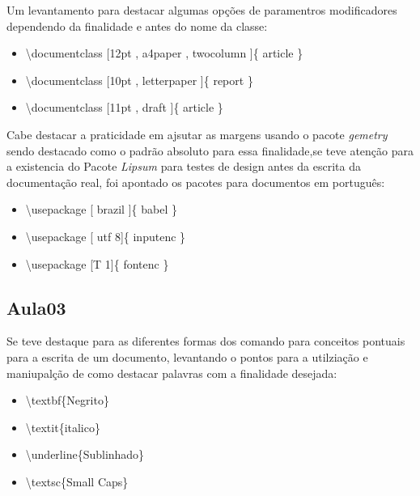 \documentclass[12pt, a4paper]{article}
\begin{document}
Um levantamento para destacar algumas opções de paramentros modificadores dependendo da finalidade e antes do nome da classe:
\begin{itemize}
    \item \textbackslash documentclass [12pt , a4paper , twocolumn ]\{ article \}
    \item \textbackslash documentclass [10pt , letterpaper ]\{ report \}
    \item  \textbackslash documentclass [11pt , draft ]\{ article \}

\end{itemize}

Cabe destacar a praticidade em ajsutar as margens usando o pacote \textit{gemetry} sendo destacado como o padrão absoluto para essa finalidade,se teve atenção para a existencia do Pacote \textit{Lipsum} para testes de design antes da escrita da documentação real,  foi apontado os pacotes para documentos em português:

\begin{itemize}
    \item \textbackslash usepackage [ brazil ]\{ babel \}
    \item \textbackslash usepackage [ utf 8]\{ inputenc \}
    \item  \textbackslash usepackage [T 1]\{ fontenc \}

\end{itemize}















\subsection{Aula03}
Se teve destaque para as diferentes formas dos comando para conceitos pontuais para a escrita de um documento, levantando o pontos para a utilziação e maniupalção de como destacar palavras com a finalidade desejada:

\begin{itemize}
    \item \textbackslash textbf\{Negrito\}
    \item \textbackslash textit\{italico\}
    \item \textbackslash underline\{Sublinhado\}
    \item \textbackslash textsc\{Small Caps\}
\end{itemize}
\end{document}
